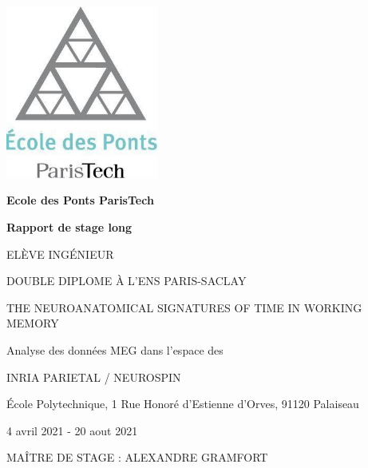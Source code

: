 \begin{titlepage}
    \begin{center}
        
        
        \includegraphics[width=5cm]{preliminaries/images/logo_ponts.jpg}
        
        \vspace{0.5cm}
        
        \textbf{Ecole des Ponts ParisTech}

        \vspace{1.5cm}
        
        \textbf{\Large Rapport de stage long}
        
        \vspace{0.5cm}
        
        \MakeUppercase{\theauthor{}}
        
        \MakeUppercase{Elève ingénieur}
        
        \MakeUppercase{Double diplome à l'ENS Paris-Saclay}
        
        \vspace{1.5cm}
        
        \MakeUppercase{The neuroanatomical signatures of time in working memory}
        
        Analyse des données MEG dans l'espace des 
    
        
        
        
        \vfill
        
        \MakeUppercase{INRIA Parietal / Neurospin}
        
        École Polytechnique, 1 Rue Honoré d'Estienne d'Orves, 91120 Palaiseau
        
        4 avril 2021 - 20 aout 2021
        
        \MakeUppercase{Maître de stage : Alexandre Gramfort}
        


        
    
        
    \end{center}
\end{titlepage}
